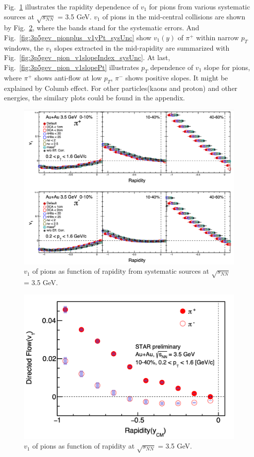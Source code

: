 Fig.~\ref{fig:3p5gev_pion_v1y_sysUnc} illustrates the rapidity dependence of $v_1$ for pions from various systematic sources at  $\sqrt{s_{NN}}$ = 3.5 GeV.
$v_1$ of pions in the mid-central collisions are shown by Fig.~\ref{fig:3p5gev_pion_v1y}, where the bands stand for the systematic errors.
And Fig.~\ref{fig:3p5gev_pionplus_v1yPt_sysUnc} show $v_1(y)$ of $\pi^{+}$ within narrow $p_T$ windows, 
the $v_1$ slopes extracted in the mid-rapidity are summarized with Fig.~\ref{fig:3p5gev_pion_v1slopeIndex_sysUnc}.
At last, Fig.~\ref{fig:3p5gev_pion_v1slopePt} illustrates $p_T$ dependence of $v_1$ slope for pions, 
where $\pi^+$ shows anti-flow at low $p_T$, $\pi^-$ shows positive slopes. It might be explained by Columb effect. 
For other particles(kaons and proton) and other energies, the similary plots could be found in the appendix. 
\begin{figure}[hbt!]
\centering
\includegraphics[width=0.95\linewidth]{figures/chapter03/3p5gev_pion_v1y_sysUnc.png}
\caption{$v_1$ of pions as function of rapidity from systematic sources at $\sqrt{s_{NN}}$ = 3.5 GeV.}
\label{fig:3p5gev_pion_v1y_sysUnc}
\end{figure}

\begin{figure}[hbt!]
\centering
\includegraphics[width=0.65\linewidth]{figures/chapter03/3p5gev_pion_v1y.png}
\caption{$v_1$ of pions as function of rapidity at $\sqrt{s_{NN}}$ = 3.5 GeV.}
\label{fig:3p5gev_pion_v1y}
\end{figure}

